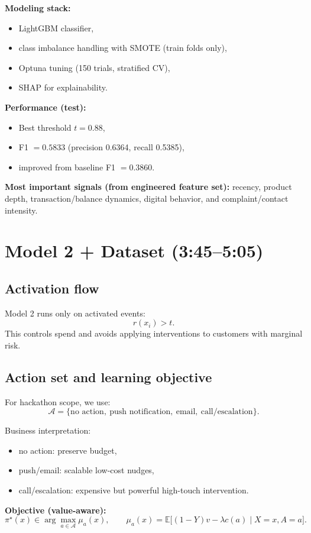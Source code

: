 \documentclass[11pt,a4paper]{article}
\begin{document}
\textbf{Modeling stack:}
\begin{itemize}
    \item LightGBM classifier,
    \item class imbalance handling with SMOTE (train folds only),
    \item Optuna tuning (150 trials, stratified CV),
    \item SHAP for explainability.
\end{itemize}

\textbf{Performance (test):}
\begin{itemize}
    \item Best threshold $t=0.88$,
    \item F1 $=0.5833$ (precision 0.6364, recall 0.5385),
    \item improved from baseline F1 $=0.3860$.
\end{itemize}

\textbf{Most important signals (from engineered feature set):}
recency, product depth, transaction/balance dynamics, digital behavior, and complaint/contact intensity.

\section{Model 2 + Dataset (3:45--5:05)}
\subsection*{Activation flow}
Model 2 runs only on activated events:
\[
r(x_i) > t.
\]
This controls spend and avoids applying interventions to customers with marginal risk.

\subsection*{Action set and learning objective}
For hackathon scope, we use:
\[
\mathcal{A}=\{\text{no action},\ \text{push notification},\ \text{email},\ \text{call/escalation}\}.
\]

Business interpretation:
\begin{itemize}
    \item no action: preserve budget,
    \item push/email: scalable low-cost nudges,
    \item call/escalation: expensive but powerful high-touch intervention.
\end{itemize}

\textbf{Objective (value-aware):}
\[
\pi^\star(x)\in\arg\max_{a\in\mathcal A}\mu_a(x),
\qquad
\mu_a(x)=\mathbb{E}\big[(1-Y)v-\lambda c(a)\mid X=x,A=a\big].
\]
\end{document}

